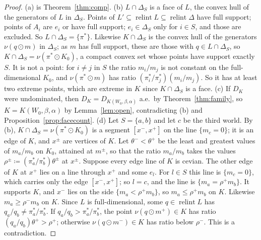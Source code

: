 \documentclass[11pt]{article}
\DeclareMathOperator{\relint}{relint}
\theoremstyle{plain}
\theoremstyle{definition}
\theoremstyle{remark}
\begin{document}
\begin{proof}
(a) is Theorem~\ref{thm:comp}. (b) $L\cap\Delta_S$ is a face of $L$, the convex hull of the
generators of $L$ in $\Delta_S$. Points of $L'\subseteq\relint L\subseteq\relint\Delta$ have
full support; points of $A_i$ are $e_i$ or have full support; $e_i\in\Delta_S$ only for
$i\in S$, and those are excluded. So $L\cap\Delta_S=\{\pi^\ast\}$. Likewise
$K\cap\Delta_S$ is the convex hull of the generators $\nu(q\odot m)$ in $\Delta_S$; as $m$
has full support, these are those with $q\in L\cap\Delta_S$, so $K\cap\Delta_S=\nu(\pi^\ast
\odot K_0)$, a compact convex set whose points have support exactly $S$. It is not a point:
for $i\ne j$ in $S$ the ratio $m_i/m_j$ is not constant on the full-dimensional $K_0$, and
$\nu(\pi^\ast\odot m)$ has ratio $(\pi^\ast_i/\pi^\ast_j)(m_i/m_j)$. So it has at least two
extreme points, which are extreme in $K$ since $K\cap\Delta_S$ is a face.
(c) If $D_K$ were undominated, then $D_K=D_{K(W_0,\beta,\alpha)}$ a.e.\ by
Theorem~\ref{thm:family}, so $K=K(W_0,\beta,\alpha)$ by Lemma~\ref{lem:open}, contradicting
(b) and Proposition~\ref{prop:facecount}.
(d) Let $S=\{a,b\}$ and let $c$ be the third world. By (b), $K\cap\Delta_S=\nu(\pi^\ast
\odot K_0)$ is a segment $[x^-,x^+]$ on the line $\{m_c=0\}$; it is an edge of $K$, and
$x^\pm$ are vertices of $K$. Let $\theta^-<\theta^+$ be the least and greatest values of
$m_a/m_b$ on $K_0$, attained at $m^\pm$, so that the ratio $m_a/m_b$ takes the values
$\rho^\pm\coloneqq(\pi^\ast_a/\pi^\ast_b)\theta^\pm$ at $x^\pm$. Suppose every edge line of
$K$ is cevian. The other edge of $K$ at $x^+$ lies on a line through $x^+$ and some $e_l$.
For $l\in S$ this line is $\{m_c=0\}$, which carries only the edge $[x^-,x^+]$; so $l=c$,
and the line is $\{m_a=\rho^+m_b\}$. It supports $K$, and $x^-$ lies on the side
$\{m_a<\rho^+m_b\}$, so $m_a\le\rho^+m_b$ on $K$. Likewise $m_a\ge\rho^-m_b$ on $K$. Since
$L$ is full-dimensional, some $q\in\relint L$ has $q_a/q_b\ne\pi^\ast_a/\pi^\ast_b$. If
$q_a/q_b>\pi^\ast_a/\pi^\ast_b$, the point $\nu(q\odot m^+)\in K$ has ratio
$(q_a/q_b)\theta^+>\rho^+$; otherwise $\nu(q\odot m^-)\in K$ has ratio below $\rho^-$. This
is a contradiction.
\end{proof}
\end{document}
